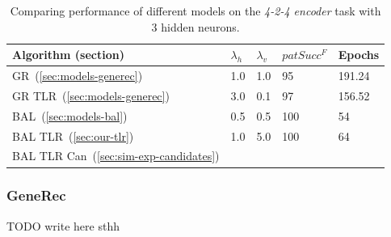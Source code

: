 \begin{table}[H] 
  \centering
    \begin{tabular}{|l|l|l|l|l|}
    \hline
    Algorithm (section)&$\lambda_h$&$\lambda_v$&$patSucc^F$ &Epochs\\ %
    \hline
    GR~(\ref{sec:models-generec}) &1.0 &1.0 &95&191.24\\ %
    \hline
    GR TLR~(\ref{sec:models-generec}) &3.0 &0.1 &97&156.52\\ %
    \hline
    BAL~(\ref{sec:models-bal})&0.5 &0.5 &100& 54\\ %
    \hline
    BAL TLR~(\ref{sec:our-tlr})&1.0& 5.0 & 100& 64\\ %
    \hline
    BAL TLR Can~(\ref{sec:sim-exp-candidates})& & & & \\ %
    \hline 
    \end{tabular}
  \caption{Comparing performance of different models on the \emph{4-2-4 encoder} task with 3 hidden neurons.} 
  \label{tab:results-cmp-k3}
\end{table}







\subsubsection{GeneRec} 
TODO write here sthh

